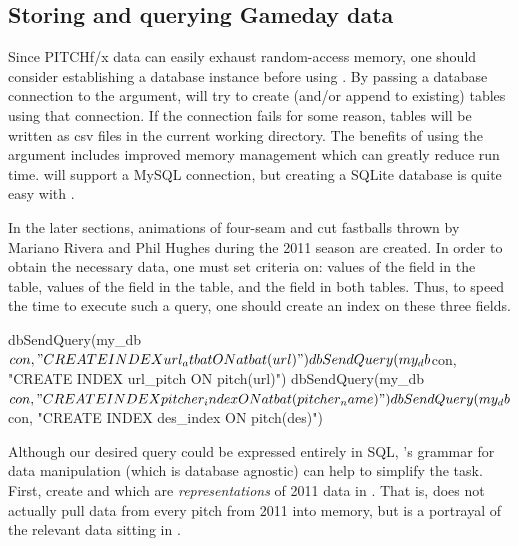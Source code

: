 \documentclass[a4paper]{report}\usepackage[]{graphicx}\usepackage[]{color}
\begin{document}
\begin{article}
\section{Storing and querying Gameday data}

Since PITCHf/x data can easily exhaust random-access memory, one should
consider establishing a database instance before using .
By passing a database connection to the  argument,
 will try to create (and/or append to existing) tables
using that connection. If the connection fails for some reason, tables
will be written as csv files in the current working directory. The
benefits of using the  argument includes improved memory
management which can greatly reduce run time.  will
support a MySQL connection, but creating a SQLite database is quite
easy with  \citep{dplyr}. 

\begin{Schunk}
\end{Schunk}


In the later sections, animations of four-seam and cut fastballs thrown
by Mariano Rivera and Phil Hughes during the 2011 season are created.
In order to obtain the necessary data, one must set criteria on: values
of the  field in the  table, values
of the  field in the  table, and the 
field in both tables. Thus, to speed the time to execute such a query,
one should create an index on these three fields.

\begin{Schunk}
\begin{Sinput}
dbSendQuery(my_db$con, "CREATE INDEX url_atbat ON atbat(url)") 
dbSendQuery(my_db$con, "CREATE INDEX url_pitch ON pitch(url)") 
dbSendQuery(my_db$con, "CREATE INDEX pitcher_index ON atbat(pitcher_name)") 
dbSendQuery(my_db$con, "CREATE INDEX des_index ON pitch(des)")
\end{Sinput}
\end{Schunk}


Although our desired query could be expressed entirely in SQL, 's
grammar for data manipulation (which is database agnostic) can help
to simplify the task. First, create  and 
which are \emph{representations} of 2011 data in .
That is,  does not actually pull data from every pitch
from 2011 into memory, but is a portrayal of the relevant data sitting
in .


\end{article}
\end{document}
